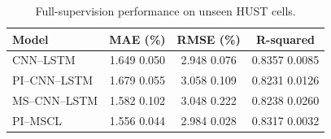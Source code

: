 \begin{table}[htbp]
\caption{Full-supervision performance on unseen HUST cells.}
\label{tab:full_supervision}
\centering
\setlength{\tabcolsep}{3.5pt}
\begin{tabular}{lccc}
\toprule
Model & MAE (\%) & RMSE (\%) & R-squared \\
\midrule
CNN--LSTM & 1.649 \textpm{} 0.050 & 2.948 \textpm{} 0.076 & 0.8357 \textpm{} 0.0085 \\
PI--CNN--LSTM & 1.679 \textpm{} 0.055 & 3.058 \textpm{} 0.109 & 0.8231 \textpm{} 0.0126 \\
MS--CNN--LSTM & 1.582 \textpm{} 0.102 & 3.048 \textpm{} 0.222 & 0.8238 \textpm{} 0.0260 \\
PI--MSCL & 1.556 \textpm{} 0.044 & 2.984 \textpm{} 0.028 & 0.8317 \textpm{} 0.0032 \\
\bottomrule
\end{tabular}
\end{table}
